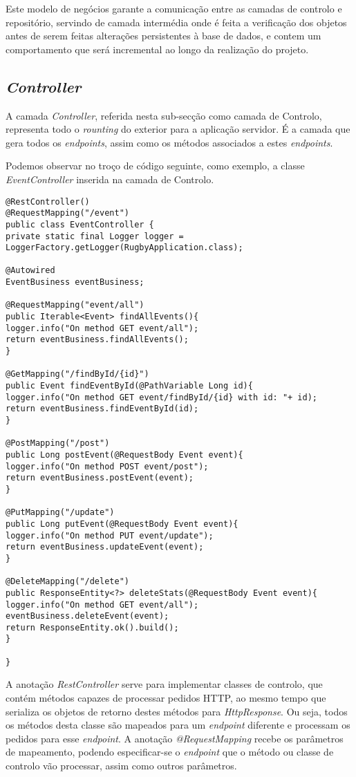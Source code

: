 Este modelo de negócios garante a comunicação entre as camadas de controlo e repositório, servindo de camada intermédia onde é feita a verificação dos objetos antes de serem feitas alterações persistentes à base de dados, e contem um comportamento que será incremental ao longo da realização do projeto.

\subsection{\emph{Controller}} \label{sec314}
A camada \emph{Controller}, referida nesta sub-secção como camada de Controlo, representa todo o \emph{rounting} do exterior para a aplicação servidor. É a camada que gera todos os \emph{endpoints}, assim como os métodos associados a estes \emph{endpoints}. 

Podemos observar no troço de código seguinte, como exemplo, a classe \emph{EventController} inserida na camada de Controlo.

\begin{verbatim}
@RestController()
@RequestMapping("/event")
public class EventController {
private static final Logger logger = LoggerFactory.getLogger(RugbyApplication.class);

@Autowired
EventBusiness eventBusiness;

@RequestMapping("event/all")
public Iterable<Event> findAllEvents(){
logger.info("On method GET event/all");
return eventBusiness.findAllEvents();
}

@GetMapping("/findById/{id}")
public Event findEventById(@PathVariable Long id){
logger.info("On method GET event/findById/{id} with id: "+ id);
return eventBusiness.findEventById(id);
}

@PostMapping("/post")
public Long postEvent(@RequestBody Event event){
logger.info("On method POST event/post");
return eventBusiness.postEvent(event);
}

@PutMapping("/update")
public Long putEvent(@RequestBody Event event){
logger.info("On method PUT event/update");
return eventBusiness.updateEvent(event);
}

@DeleteMapping("/delete")
public ResponseEntity<?> deleteStats(@RequestBody Event event){
logger.info("On method GET event/all");
eventBusiness.deleteEvent(event);
return ResponseEntity.ok().build();
}

}
\end{verbatim}

A anotação \emph{RestController} serve para implementar classes de controlo, que contém métodos capazes de processar pedidos HTTP, ao mesmo tempo que serializa os objetos de retorno destes métodos para \emph{HttpResponse}.
Ou seja, todos os métodos desta classe são mapeados para um \emph{endpoint} diferente e processam os pedidos para esse \emph{endpoint}.
A anotação \emph{@RequestMapping} recebe os parâmetros de mapeamento, podendo especificar-se o \emph{endpoint} que o método ou classe de controlo vão processar, assim como outros parâmetros. 

